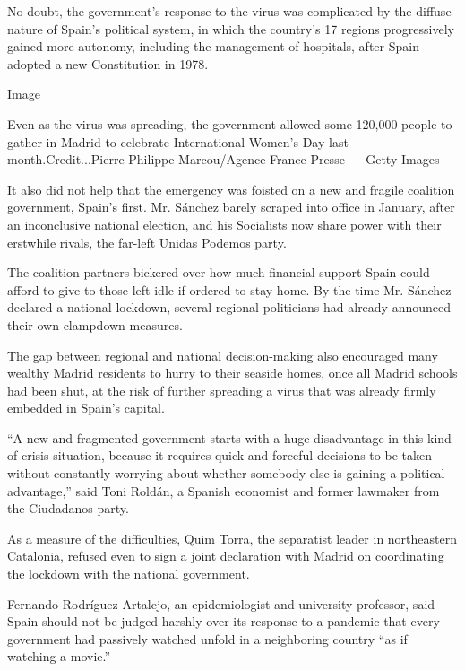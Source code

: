 No doubt, the government's response to the virus was complicated by the
diffuse nature of Spain's political system, in which the country's 17
regions progressively gained more autonomy, including the management of
hospitals, after Spain adopted a new Constitution in 1978.

Image

Even as the virus was spreading, the government allowed some 120,000
people to gather in Madrid to celebrate International Women's Day last
month.Credit...Pierre-Philippe Marcou/Agence France-Presse --- Getty
Images

It also did not help that the emergency was foisted on a new and fragile
coalition government, Spain's first. Mr. Sánchez barely scraped into
office in January, after an inconclusive national election, and his
Socialists now share power with their erstwhile rivals, the far-left
Unidas Podemos party.

The coalition partners bickered over how much financial support Spain
could afford to give to those left idle if ordered to stay home. By the
time Mr. Sánchez declared a national lockdown, several regional
politicians had already announced their own clampdown measures.

The gap between regional and national decision-making also encouraged
many wealthy Madrid residents to hurry to their
\href{https://www.nytimes3xbfgragh.onion/2020/03/29/world/europe/rich-coronavirus-second-homes.html?searchResultPosition=1\&fbclid=IwAR0YsBYnhBLvSmo73JjCjfG73mNYyFpq6eCF_KCZQSzumlZa0v7yK6y2ORA}{seaside
homes}, once all Madrid schools had been shut, at the risk of further
spreading a virus that was already firmly embedded in Spain's capital.

``A new and fragmented government starts with a huge disadvantage in
this kind of crisis situation, because it requires quick and forceful
decisions to be taken without constantly worrying about whether somebody
else is gaining a political advantage,'' said Toni Roldán, a Spanish
economist and former lawmaker from the Ciudadanos party.

As a measure of the difficulties, Quim Torra, the separatist leader in
northeastern Catalonia, refused even to sign a joint declaration with
Madrid on coordinating the lockdown with the national government.

Fernando Rodríguez Artalejo, an epidemiologist and university professor,
said Spain should not be judged harshly over its response to a pandemic
that every government had passively watched unfold in a neighboring
country ``as if watching a movie.''

